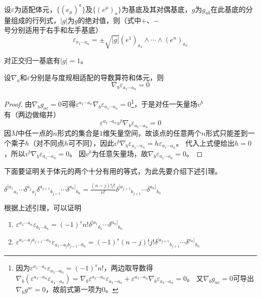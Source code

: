 \begin{theorem}
    设$\varepsilon$为适配体元，$\{(e_\mu)^a\}$及$\{(e^\mu)_a\}$为基底及其对偶基底，$g$为$g_{ab}$在此基底的分量组成的行列式，$|g|$为$g$的绝对值，则（式中$+$、$-$号分别适用于右手和左手基底）
    $$\varepsilon_{a_1 \cdots a_n} = \pm\sqrt{|g|}(e^1)_{a_1} \wedge \cdots \wedge (e^n)_{a_n}$$
\end{theorem}

\begin{note}
    对正交归一基底有$|g| = 1$。
\end{note}

\begin{theorem}
    设$\nabla_a$和$\varepsilon$分别是与度规相适配的导数算符和体元，则
    $$\nabla_b\varepsilon_{a_1 \cdots a_n} = 0$$
\end{theorem}

\begin{proof}
    由$\nabla_bg_{ac} = 0$可得$\varepsilon^{a_1 \cdots a_n}\nabla_b\varepsilon_{a_1 \cdots a_n} = 0$\footnote{
        因为$\varepsilon^{a_1 \cdots a_n}\varepsilon_{a_1 \cdots a_n} = (-1)^sn!$，两边取导数得$\nabla_b(\varepsilon^{a_1 \cdots a_n}\varepsilon_{a_1 \cdots a_n}) = \nabla_b\varepsilon^{a_1 \cdots a_n}\varepsilon_{a_1 \cdots a_n} + \varepsilon^{a_1 \cdots a_n}\nabla_b\varepsilon_{a_1 \cdots a_n} = 0$。
        又$\nabla_bg_{ac} = 0$可导出$\nabla_bg^{ac} = 0$，故前式第一项为0。
    }，于是对任一矢量场$v^b$有（两边做缩并）
    $$\varepsilon^{a_1 \cdots a_n}v^b\nabla_b\varepsilon_{a_1 \cdots a_n} = 0$$
    因$M$中任一点的$n$形式的集合是$1$维矢量空间，故该点的任意两个$n$形式只能差到一个乘子$h$（对不同点$h$可不同），因此$v^b\nabla_b\varepsilon_{a_1 \cdots a_n} = h\varepsilon_{a_1 \cdots a_n}$。
    代入上式便给出$h = 0$，所以$v^b\nabla_b\varepsilon_{a_1 \cdots a_n} = 0$。
    因$v^b$为任意矢量场，故$\nabla_b\varepsilon_{a_1 \cdots a_n} = 0$。
\end{proof}

下面要证明关于体元的两个十分有用的等式，为此先要介绍下述引理。

\begin{theorem}
    $\delta^{[a_1}{}_{a_1} \cdots \delta^{a_j}{}_{a_j}\delta^{a_{j + 1}}{}_{b_{j + 1}} \cdots \delta^{a_n]}{}_{b_n} = \displaystyle\frac{(n - j)!j!}{n!}\delta^{[a_{j + 1}}{}_{b_{j + 1}} \cdots \delta^{a_n]}{}_{b_n}$
\end{theorem}

根据上述引理，可以证明

\begin{theorem}
    \begin{enumerate}[（a）]
        \item $\varepsilon^{a_1 \cdots a_n}\varepsilon_{b_1 \cdots b_n} = (-1)^sn!\delta^{[a_1}{}_{b_1} \cdots \delta^{a_n]}{}_{b_n}$
        \item $\varepsilon^{a_1 \cdots a_j a_{j + 1} \cdots a_n}\varepsilon_{a_1 \cdots a_j b_{j + 1} \cdots b_n} = (-1)^s(n - j)!j!\delta^{[a_{j + 1}}{}_{b_{j + 1}} \cdots \delta^{a_n]}{}_{b_n}$
    \end{enumerate}
\end{theorem}

